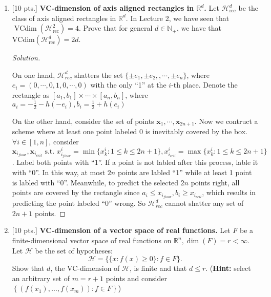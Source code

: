 \documentclass[12pt,letterpaper]{article}
\newenvironment{solution}{%
  \begin{proof}[Solution]$ $\par\nobreak\ignorespaces
}{%
  \end{proof}
}
\def \H{\mathcal H}
\def \x{\boldsymbol{x}}
\newcommand{\st}{\text{ s.t. }}
\begin{document}
\begin{enumerate}
\item {{[10 pts.]}}
{\bf VC-dimension of axis aligned rectangles in $\mathbb{R}^{d}$.} Let $\mathcal{H}_{\mathrm{rec}}^{d}$ be the class of axis aligned rectangles in $\mathbb{R}^{d}$. In Lecture 2, we have seen that $\operatorname{VCdim}\left(\mathcal{H}_{\mathrm{rec }}^{2}\right)=4$. Prove that for general $d \in \mathbb{N}_+$, we have that $\mathrm{VCdim}\left(\mathcal{H}_{\mathrm{rec}}^{d}\right)=2 d$.
\begin{solution}
  On one hand, $\H_{rec}^{d}$ shatters the set $\{\pm e_{1},\pm e_{2},,\cdots, \pm e_{n}\}$, where $e_{i}=(0,\cdots,0,1,0,\cdots, 0)$ with the only ``1'' at the $i$-th place. Denote the rectangle as $[a_{1},b_{1}]\times\cdots\times[a_{n},b_{n}]$, where $a_{i}=-\frac{1}{2}-h(-e_{i}),b_{i}=\frac{1}{2}+h(e_{i})$

  On the other hand, consider the set of points $\x_{1},\cdots,\x_{2n+1}$. Now we contruct a scheme where at least one point labeled $0$ is inevitably covered by the box. $\forall i\in [1,n]$, consider $\x_{i_{floor}},\x_{i_{ceil}}\st x_{i_{floor}}^{i}=\min\{x_{k}^{i}:1\leq k\leq 2n+1\}, x_{i_{ceil}}^{i}=\max\{x_{k}^{i}:1\leq k\leq 2n+1\}$. Label both points with ``1''. If a point is not labled after this process, lable it with ``0''. In this way, at most $2n$ points are labled ``1'' while at least 1 point is labled with ``0''. Meanwhile, to predict the selected $2n$ points right, all points are covered by the rectangle since $a_{i}\leq x_{i_{floor}},b_{i}\geq x_{i_{ceil}}$, which results in predicting the point labeled ``0'' wrong. So $\H^{d}_{rec}$ cannot shatter any set of $2n+1$ points.

\end{solution}

\item {[10 pts.]}
{\bf VC-dimension of a vector space of real functions.} Let $F$ be a finite-dimensional vector space of real functions on $\mathbb{R}^{n}, \operatorname{dim}(F)=r<\infty$. Let $\mathcal{H}$ be the set of hypotheses:
\[
\mathcal{H}=\{\{x: f(x) \geq 0\}: f \in F\} .
\]
Show that $d$, the VC-dimension of $\mathcal{H}$, is finite and that $d \leq r$.
(\textbf{Hint:} select an arbitrary set of $m=r+1$ points and consider $\left\{(f\left(x_{1}\right), \ldots, f\left(x_{m}\right)):f\in F\right\}$)


\end{enumerate}
\end{document}
